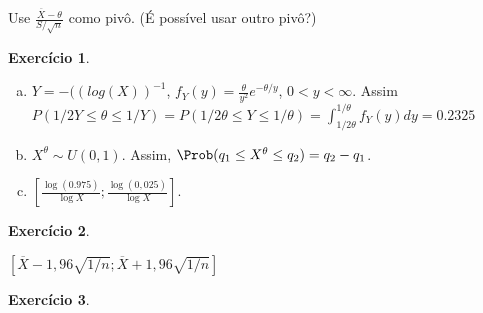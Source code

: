 \documentclass[letter,11pt]{article}
\newtheorem{exer}{Exercício}
\begin{document}
Use $\frac{\overline{X}-\theta}{S/\sqrt{n}}$ como pivô. (É possível usar outro pivô?)


\begin{exer} \rm
\end{exer}

\begin{enumerate}[a)]
\item $Y=-((log(X))^{-1}$, $f_Y(y)=\frac{\theta}{y^2}e^{-\theta/y}$, $0<y<\infty$. Assim $P(1/2Y\leq \theta\leq 1/Y) = P(1/2\theta \leq Y \leq 1/\theta) = \int_{1/2\theta}^{1/\theta}f_Y(y)dy=0.2325$
\item $X^\theta \sim U(0,1)$. Assim, $\Prob(q_1\leq X^\theta\leq q_2)=q_2-q_1$. 
\item $\left[\frac{\log(0.975)}{\log X} ; \frac{\log(0,025)}{\log X}\right]$.
\end{enumerate}


\begin{exer} \rm
\end{exer}

$\left[\overline{X}-1,96\sqrt{1/n};  \overline{X}+1,96\sqrt{1/n}\right]$

\newpage
\begin{exer} \rm
\end{exer}
\end{document}
